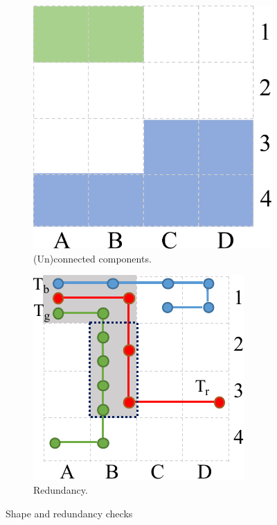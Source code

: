 \documentclass[
]{ceurart}
\begin{document}
\begin{figure}[t]
\begin{subfigure}{.48\columnwidth}
    \centering
    \includegraphics[scale=.18]{pruning.pdf}
    \caption{(Un)connected components.}
    \label{fig:conncomp}
\end{subfigure}
\begin{subfigure}{.48\columnwidth}
    \centering
    \includegraphics[scale=.6]{theorem.pdf}
    \caption{Redundancy.}
    \label{fig:theorem}
\end{subfigure}
\caption{Shape and redundancy checks}
\end{figure}
\end{document}

